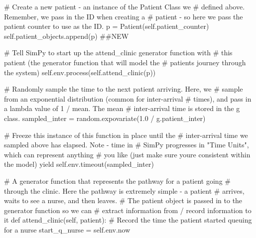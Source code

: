 \documentclass[
  letterpaper,
  DIV=11,
  numbers=noendperiod]{scrreprt}
\newenvironment{Shaded}{\begin{snugshade}}{\end{snugshade}}
\newcommand{\CommentTok}[1]{\textcolor[rgb]{0.37,0.37,0.37}{#1}}
\newcommand{\ControlFlowTok}[1]{\textcolor[rgb]{0.00,0.23,0.31}{#1}}
\newcommand{\FloatTok}[1]{\textcolor[rgb]{0.68,0.00,0.00}{#1}}
\newcommand{\KeywordTok}[1]{\textcolor[rgb]{0.00,0.23,0.31}{#1}}
\newcommand{\NormalTok}[1]{\textcolor[rgb]{0.00,0.23,0.31}{#1}}
\newcommand{\OperatorTok}[1]{\textcolor[rgb]{0.37,0.37,0.37}{#1}}
\newcommand{\VariableTok}[1]{\textcolor[rgb]{0.07,0.07,0.07}{#1}}
\begin{document}
\begin{tcolorbox}
\begin{Shaded}
\begin{Highlighting}[]
            \CommentTok{\# Create a new patient {-} an instance of the Patient Class we}
            \CommentTok{\# defined above.  Remember, we pass in the ID when creating a}
            \CommentTok{\# patient {-} so here we pass the patient counter to use as the ID.}
\NormalTok{            p }\OperatorTok{=}\NormalTok{ Patient(}\VariableTok{self}\NormalTok{.patient\_counter)}
            \VariableTok{self}\NormalTok{.patient\_objects.append(p) }\CommentTok{\#\#NEW}

            \CommentTok{\# Tell SimPy to start up the attend\_clinic generator function with}
            \CommentTok{\# this patient (the generator function that will model the}
            \CommentTok{\# patient\textquotesingle{}s journey through the system)}
            \VariableTok{self}\NormalTok{.env.process(}\VariableTok{self}\NormalTok{.attend\_clinic(p))}

            \CommentTok{\# Randomly sample the time to the next patient arriving.  Here, we}
            \CommentTok{\# sample from an exponential distribution (common for inter{-}arrival}
            \CommentTok{\# times), and pass in a lambda value of 1 / mean.  The mean}
            \CommentTok{\# inter{-}arrival time is stored in the g class.}
\NormalTok{            sampled\_inter }\OperatorTok{=}\NormalTok{ random.expovariate(}\FloatTok{1.0} \OperatorTok{/}\NormalTok{ g.patient\_inter)}

            \CommentTok{\# Freeze this instance of this function in place until the}
            \CommentTok{\# inter{-}arrival time we sampled above has elapsed.  Note {-} time in}
            \CommentTok{\# SimPy progresses in "Time Units", which can represent anything}
            \CommentTok{\# you like (just make sure you\textquotesingle{}re consistent within the model)}
            \ControlFlowTok{yield} \VariableTok{self}\NormalTok{.env.timeout(sampled\_inter)}

    \CommentTok{\# A generator function that represents the pathway for a patient going}
    \CommentTok{\# through the clinic.  Here the pathway is extremely simple {-} a patient}
    \CommentTok{\# arrives, waits to see a nurse, and then leaves.}
    \CommentTok{\# The patient object is passed in to the generator function so we can}
    \CommentTok{\# extract information from / record information to it}
    \KeywordTok{def}\NormalTok{ attend\_clinic(}\VariableTok{self}\NormalTok{, patient):}
        \CommentTok{\# Record the time the patient started queuing for a nurse}
\NormalTok{        start\_q\_nurse }\OperatorTok{=} \VariableTok{self}\NormalTok{.env.now}


\end{Highlighting}
\end{Shaded}
\end{tcolorbox}
\end{document}
